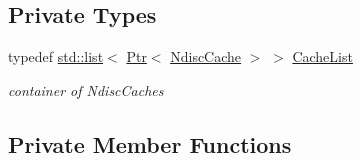 \subsection*{Private Types}
\begin{DoxyCompactItemize}
\item 
typedef \hyperlink{openflow-interface_8h_afd9bcfa176617760671b67580f536fa7}{std\+::list}$<$ \hyperlink{classns3_1_1Ptr}{Ptr}$<$ \hyperlink{classns3_1_1NdiscCache}{Ndisc\+Cache} $>$ $>$ \hyperlink{classns3_1_1Icmpv6L4Protocol_ac7bab2dfb09ca225828e92673c9e3b11}{Cache\+List}
\begin{DoxyCompactList}\small\item\em container of Ndisc\+Caches \end{DoxyCompactList}\end{DoxyCompactItemize}
\subsection*{Private Member Functions}
